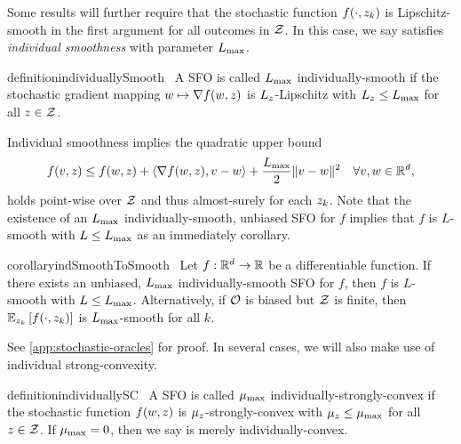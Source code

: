 Some results will further require that the stochastic function \( f(\cdot, \zk) \) is Lipschitz-smooth in the first argument for all outcomes in \( \calZ \).
In this case, we say \oracle{} satisfies \emph{individual smoothness} with parameter \( \Lmax \).
\begin{restatable}{definition}{individuallySmooth}~\label{def:individually-smooth}
    A \ac{SFO} \oracle{} is called \( \Lmax \) individually-smooth if the stochastic gradient mapping \( \w \mapsto \grad(\w, \z) \) is \( L_{\z} \)-Lipschitz with \( L_{\z} \leq \Lmax \) for all \( \z \in \calZ \).
\end{restatable}
Individual smoothness implies the quadratic upper bound
\[ f(v, \z) \leq f(\w, \z) + \abr{\grad(\w, \z), v - \w} + \frac{\Lmax}{2}\norm{v - \w}^2 \quad \forall v, \w \in \R^d, \]
holds point-wise over \( \calZ \) and thus almost-surely for each \( \zk \).
Note that the existence of an \( \Lmax \) individually-smooth, unbiased \ac{SFO} for \( f \) implies that \( f \) is \( L \)-smooth with \( L \leq \Lmax \) as an immediately corollary.
\begin{restatable}{corollary}{indSmoothToSmooth}~\label{cor:ind-smooth-to-smooth}
    Let \( f : \R^d \rightarrow \R \) be a differentiable function.  
    If there exists an unbiased, \( \Lmax \) individually-smooth \ac{SFO} \oracle{} for \( f \), then \( f \) is \( L \)-smooth with \( L \leq \Lmax \).
    Alternatively, if \( \oracle{} \) is biased but \( \calZ \) is finite, then \( \Ek \sbr{f(\cdot, \zk)} \) is \( \Lmax \)-smooth for all \( k \). 
\end{restatable}
See \autoref{app:stochastic-oracles} for proof. 
In several cases, we will also make use of individual strong-convexity.
\begin{restatable}{definition}{individuallySC}~\label{def:individually-sc}
    A \ac{SFO} \oracle{} is called \( \mumax \) individually-strongly-convex if the stochastic function \( f(\w, \z) \) is \( \mu_{\z} \)-strongly-convex with \( \mu_{\z} \leq \mumax \) for all \( \z \in \calZ \).
    If \( \mumax = 0 \), then we say \oracle{} is merely individually-convex.
\end{restatable}


